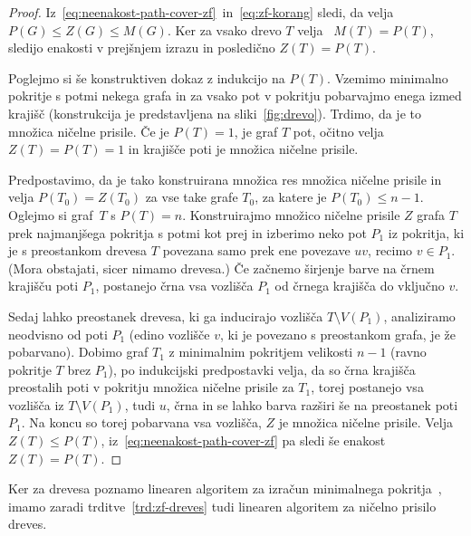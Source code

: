 \documentclass[12pt,a4paper,twoside]{article}
\theoremstyle{definition} %
\theoremstyle{plain} %
\numberwithin{equation}{section}  %
\begin{document}
\begin{proof}
    Iz~\eqref{eq:neenakost-path-cover-zf}~in~\eqref{eq:zf-korang} sledi, da velja $P(G) \leq Z(G) \leq M(G)$. Ker za vsako drevo $T$ velja~\cite{johnson1999maximum} $M(T) = P(T)$, sledijo enakosti v prejšnjem izrazu in posledično $Z(T) = P(T)$.

    Poglejmo si še konstruktiven dokaz z indukcijo na $P(T)$. Vzemimo minimalno pokritje s potmi nekega grafa in za vsako pot v pokritju pobarvajmo enega izmed krajišč (konstrukcija je predstavljena na sliki~\ref{fig:drevo}). Trdimo, da je to množica ničelne prisile. Če je $P(T) = 1$, je graf $T$ pot, očitno velja $Z(T) = P(T) = 1$ in krajišče poti je množica ničelne prisile.

    Predpostavimo, da je tako konstruirana množica res množica ničelne prisile in velja $P(T_0) = Z(T_0)$ za vse take grafe $T_0$, za katere je $P(T_0) \leq n - 1$. Oglejmo si graf~$T$ s $P(T) = n$. Konstruirajmo množico ničelne prisile $Z$ grafa $T$ prek najmanjšega pokritja s potmi kot prej in izberimo neko pot $P_1$ iz pokritja, ki je s preostankom drevesa $T$ povezana samo prek ene povezave $uv$, recimo $v \in P_1$. (Mora obstajati, sicer nimamo drevesa.) Če začnemo širjenje barve na črnem krajišču poti $P_1$, postanejo črna vsa vozlišča $P_1$ od črnega krajišča do vključno $v$.

    Sedaj lahko preostanek drevesa, ki ga inducirajo vozlišča $T \setminus V(P_1)$, analiziramo neodvisno od poti $P_1$ (edino vozlišče $v$, ki je povezano s preostankom grafa, je že pobarvano). Dobimo graf $T_1$ z minimalnim pokritjem velikosti $n-1$ (ravno pokritje $T$ brez $P_1$), po indukcijski predpostavki velja, da so črna krajišča preostalih poti v pokritju množica ničelne prisile za $T_1$, torej postanejo vsa vozlišča iz $T \setminus V(P_1)$, tudi $u$, črna in se lahko barva razširi še na preostanek poti $P_1$. Na koncu so torej pobarvana vsa vozlišča, $Z$ je množica ničelne prisile. Velja $Z(T) \leq P(T)$, iz~\eqref{eq:neenakost-path-cover-zf} pa sledi še enakost $Z(T) = P(T)$.
\end{proof}

Ker za drevesa poznamo linearen algoritem za izračun minimalnega pokritja~\cite{franzblau2002hamiltoniancompletions}, imamo zaradi trditve~\ref{trd:zf-dreves} tudi linearen algoritem za ničelno prisilo dreves.
\end{document}
